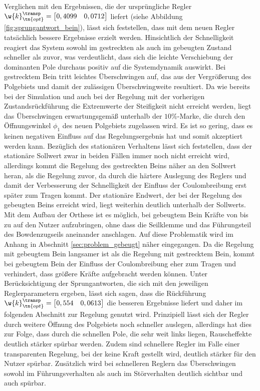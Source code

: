 Verglichen mit den Ergebnissen, die der ursprüngliche Regler $\w{k}_\tn{opt}^\transp = \begin{bmatrix} 0,4099 & 0,0712\end{bmatrix}$ liefert (siehe Abbildung \ref{fig:sprungantwort_bein}), lässt sich feststellen, dass mit dem neuen Regler tatsächlich bessere Ergebnisse erzielt werden. Hinsichtlich der Schnelligkeit reagiert das System sowohl im gestreckten als auch im gebeugten Zustand schneller als zuvor, was verdeutlicht, dass sich die leichte Verschiebung der dominanten Pole durchaus positiv auf die Systemdynamik auswirkt. Bei gestrecktem Bein tritt leichtes Überschwingen auf, das aus der Vergrößerung des Polgebiets und damit der zulässigen Überschwingweite resultiert. Da wie bereits bei der Simulation und auch bei der Regelung mit der vorherigen Zustandsrückführung die Extremwerte der Steifigkeit nicht erreicht werden, liegt das Überschwingen erwartungsgemäß unterhalb der $10\%$-Marke, die durch den Öffnungswinkel $\phi_1$ des neuen Polgebiets zugelassen wird. Es ist so gering, dass es keinen negativen Einfluss auf das Regelungsergebnis hat und somit akzeptiert werden kann. Bezüglich des stationären Verhaltens lässt sich feststellen, dass der stationäre Sollwert zwar in beiden Fällen immer noch nicht erreicht wird, allerdings kommt die Regelung des gestreckten Beins näher an den Sollwert heran, als die Regelung zuvor, da durch die härtere Auslegung des Reglers und damit der Verbesserung der Schnelligkeit der Einfluss der Coulombreibung erst später zum Tragen kommt. Der stationäre Endwert, der bei der Regelung des gebeugten Beins erreicht wird, liegt weiterhin deutlich unterhalb der Sollwerts. Mit dem Aufbau der Orthese ist es möglich, bei gebeugtem Bein Kräfte von bis zu  auf den Nutzer aufzubringen, ohne dass die Seilklemme und das Führungsteil des Bowdenzugseils aneinander anschlagen. Auf diese Problematik wird im Anhang in Abschnitt \ref{sec:problem_gebeugt} näher eingegangen. Da die Regelung mit gebeugtem Bein langsamer ist als die Regelung mit gestrecktem Bein, kommt bei gebeugtem Bein der Einfluss der Coulombreibung eher zum Tragen und verhindert, dass größere Kräfte aufgebracht werden können. Unter Berücksichtigung der Sprungantworten, die sich mit den jeweiligen Reglerparametern ergeben, lässt sich sagen, dass die Rückführung $\w{k}_\tn{opt}^\transp = \begin{bmatrix} 0,554 & 0,0613\end{bmatrix}$ die besseren Ergebnisse liefert und daher im folgenden Abschnitt zur Regelung genutzt wird. Prinzipiell lässt sich der Regler durch weitere Öffnung des Polgebiets noch schneller auslegen, allerdings hat dies zur Folge, dass durch die schnellen Pole, die sehr weit links liegen, Rauscheffekte deutlich stärker spürbar werden. Zudem sind schnellere Regler im Falle einer transparenten Regelung, bei der keine Kraft gestellt wird, deutlich stärker für den Nutzer spürbar. Zusätzlich wird bei schnelleren Reglern das Überschwingen sowohl im Führungsverhalten als auch im Störverhalten deutlich sichtbar und auch spürbar. 
